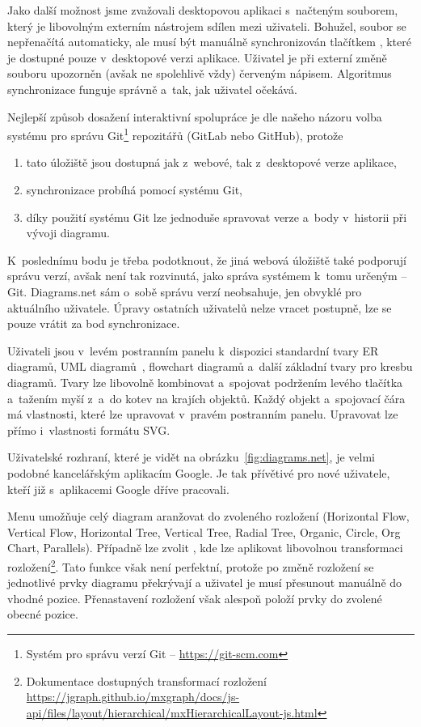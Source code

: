 Jako další možnost jsme zvažovali desktopovou aplikaci s~načteným souborem, který je libovolným externím nástrojem sdílen mezi uživateli.
Bohužel, soubor se nepřenačítá automaticky, ale musí být manuálně synchronizován tlačítkem , které je dostupné pouze v~desktopové verzi aplikace.
Uživatel je při externí změně souboru upozorněn (avšak ne spolehlivě vždy) červeným nápisem.
Algoritmus synchronizace funguje správně a~tak, jak uživatel očekává.

Nejlepší způsob dosažení interaktivní spolupráce je dle našeho názoru volba systému pro správu Git\footnote{Systém pro správu verzí Git -- \url{https://git-scm.com}} repozitářů (GitLab nebo GitHub), protože
\begin{enumerate}
  \item tato úložiště jsou dostupná jak z~webové, tak z~desktopové verze aplikace,
  \item synchronizace probíhá pomocí systému Git,
  \item díky použití systému Git lze jednoduše spravovat verze a~body v~historii při vývoji diagramu.
\end{enumerate}

K~poslednímu bodu je třeba podotknout, že jiná webová úložiště také podporují správu verzí, avšak není tak rozvinutá, jako správa systémem k~tomu určeným -- Git.
Diagrams.net sám o~sobě správu verzí neobsahuje, jen obvyklé  pro aktuálního uživatele.
Úpravy ostatních uživatelů nelze vracet postupně, lze se pouze vrátit za bod synchronizace.

Uživateli jsou v~levém postranním panelu k~dispozici standardní tvary ER diagramů, UML diagramů~\cite{uml2017}, flowchart diagramů a~další základní tvary pro kresbu diagramů.
Tvary lze libovolně kombinovat a~spojovat podržením levého tlačítka a~tažením myší z~a~do kotev na krajích objektů.
Každý objekt a~spojovací čára má vlastnosti, které lze upravovat v~pravém postranním panelu.
Upravovat lze přímo i~vlastnosti formátu SVG.

Uživatelské rozhraní, které je vidět na obrázku~\ref{fig:diagrams.net}, je velmi podobné kancelářským aplikacím Google.
Je tak přívětivé pro nové uživatele, kteří již s~aplikacemi Google dříve pracovali.

Menu  umožňuje celý diagram aranžovat do zvoleného rozložení (Horizontal Flow, Vertical Flow, Horizontal Tree, Vertical Tree, Radial Tree, Organic, Circle, Org Chart, Parallels).
Případně lze zvolit , kde lze aplikovat libovolnou transformaci rozložení\footnote{Dokumentace dostupných transformací rozložení \url{https://jgraph.github.io/mxgraph/docs/js-api/files/layout/hierarchical/mxHierarchicalLayout-js.html}}.
Tato funkce však není perfektní, protože po změně rozložení se jednotlivé prvky diagramu překrývají a uživatel je musí přesunout manuálně do vhodné pozice.
Přenastavení rozložení však alespoň položí prvky do zvolené obecné pozice.

